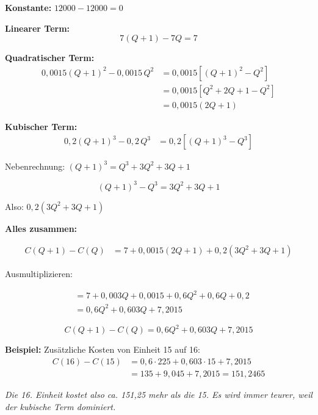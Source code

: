 \documentclass[12pt, a4paper]{article}
\begin{document}
\textbf{Konstante:} $12000 - 12000 = 0$

\textbf{Linearer Term:}
\[
    7(Q+1) - 7Q = 7
\]

\textbf{Quadratischer Term:}
\begin{align*}
    0{,}0015(Q+1)^2 - 0{,}0015\,Q^2 &= 0{,}0015\left[(Q+1)^2 - Q^2\right] \\
    &= 0{,}0015\left[Q^2 + 2Q + 1 - Q^2\right] \\
    &= 0{,}0015(2Q + 1)
\end{align*}

\textbf{Kubischer Term:}
\begin{align*}
    0{,}2(Q+1)^3 - 0{,}2\,Q^3 &= 0{,}2\left[(Q+1)^3 - Q^3\right]
\end{align*}

Nebenrechnung: $(Q+1)^3 = Q^3 + 3Q^2 + 3Q + 1$

\[
    (Q+1)^3 - Q^3 = 3Q^2 + 3Q + 1
\]

Also: $0{,}2(3Q^2 + 3Q + 1)$

\bigskip

\textbf{Alles zusammen:}

\begin{align*}
    C(Q+1) - C(Q) &= 7 + 0{,}0015(2Q + 1) + 0{,}2(3Q^2 + 3Q + 1)
\end{align*}

Ausmultiplizieren:

\begin{align*}
    &= 7 + 0{,}003Q + 0{,}0015 + 0{,}6Q^2 + 0{,}6Q + 0{,}2 \\[6pt]
    &= 0{,}6Q^2 + 0{,}603Q + 7{,}2015
\end{align*}

\[
    \boxed{C(Q+1) - C(Q) = 0{,}6Q^2 + 0{,}603Q + 7{,}2015}
\]

\bigskip

\textbf{Beispiel:} Zusätzliche Kosten von Einheit 15 auf 16:
\begin{align*}
    C(16) - C(15) &= 0{,}6 \cdot 225 + 0{,}603 \cdot 15 + 7{,}2015 \\
    &= 135 + 9{,}045 + 7{,}2015 = \boxed{151{,}2465}
\end{align*}

\textit{Die 16. Einheit kostet also ca. 151,25 mehr als die 15. Es wird immer teurer, weil der kubische Term dominiert.}
\end{document}
